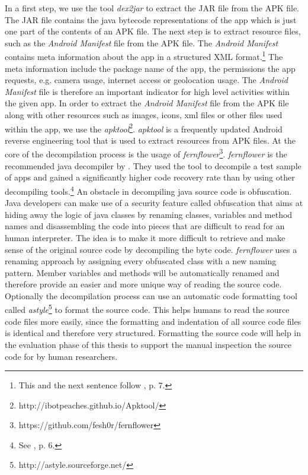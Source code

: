 In a first step, we use the tool \textit{dex2jar} to extract the \acs{JAR} file from the APK file.
The JAR file contains the java bytecode representations of the app which is just one part of the contents of an \acs{APK} file.
The next step is to extract resource files, such as the \textit{Android Manifest} file from the APK file.
The \textit{Android Manifest} contains meta information about the app in a structured XML format.\footnote{This and the next sentence follow \cite{xu2013}, p. 7.}
The meta information include the package name of the app, the permissions the app requests, e.g. camera usage, internet access or geolocation usage.
The \textit{Android Manifest} file is therefore an important indicator for high level activities within the given app.
In order to extract the \textit{Android Manifest} file from the APK file along with other resources such as images, icons, xml files or other files used within the app, we use the \textit{apktool}\footnote{http://ibotpeaches.github.io/Apktool/}.
\textit{apktool} is a frequently updated Android reverse engineering tool that is used to extract resources from APK files.
At the core of the decompilation process is the usage of \textit{fernflower}\footnote{https://github.com/fesh0r/fernflower}.
\textit{fernflower} is the recommended java decompiler by \cite{Enck2011}. 
They used the tool to decompile a test sample of apps and gained a significantly higher code recovery rate than by using other decompiling tools.\footnote{See \cite{Enck2011}, p. 6.}
An obstacle in decompiling java source code is obfuscation. 
Java developers can make use of a security feature called obfuscation that aims at hiding away the logic of java classes by renaming classes, variables and method names and disassembling the code into pieces that are difficult to read for an human interpreter.
The idea is to make it more difficult to retrieve and make sense of the original source code by decompiling the byte code.
\textit{fernflower} uses a renaming approach by assigning every obfuscated class with a new naming pattern. 
Member variables and methods will be automatically renamed and therefore provide an easier and more unique way of reading the source code.
Optionally the decompilation process can use an automatic code formatting tool called \textit{astyle}\footnote{http://astyle.sourceforge.net/} to format the source code.
This helps humans to read the source code files more easily, since the formatting and indentation of all source code files is identical and therefore very structured.
Formatting the source code will help in the evaluation phase of this thesis to support the manual inspection the source code for \ipr by human researchers.


